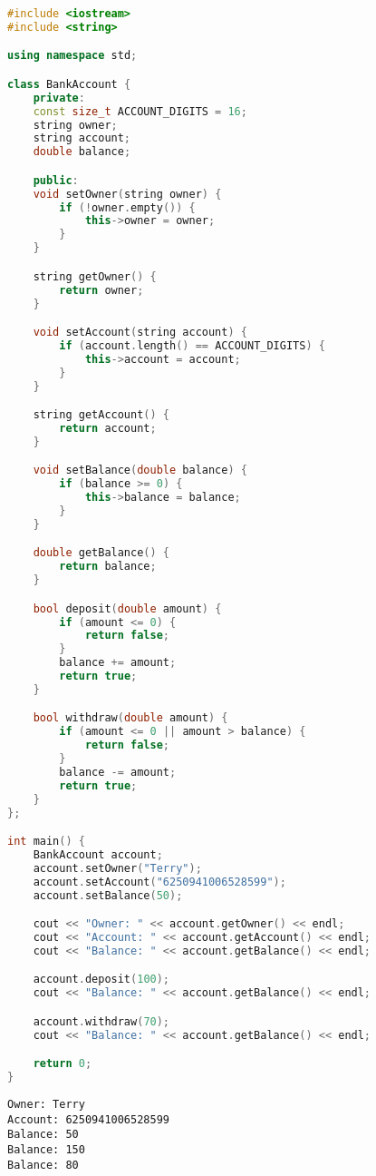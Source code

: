 \begin{lstlisting}[language=C++]
#include <iostream>
#include <string>

using namespace std;

class BankAccount {
    private:
    const size_t ACCOUNT_DIGITS = 16;
    string owner;
    string account;
    double balance;

    public:
    void setOwner(string owner) {
        if (!owner.empty()) {
            this->owner = owner;
        }
    }

    string getOwner() {
        return owner;
    }

    void setAccount(string account) {
        if (account.length() == ACCOUNT_DIGITS) {
            this->account = account;
        }
    }

    string getAccount() {
        return account;
    }

    void setBalance(double balance) {
        if (balance >= 0) {
            this->balance = balance;
        }
    }

    double getBalance() {
        return balance;
    }

    bool deposit(double amount) {
        if (amount <= 0) {
            return false;
        }
        balance += amount;
        return true;
    }

    bool withdraw(double amount) {
        if (amount <= 0 || amount > balance) {
            return false;
        }
        balance -= amount;
        return true;
    }
};

int main() {
    BankAccount account;
    account.setOwner("Terry");
    account.setAccount("6250941006528599");
    account.setBalance(50);

    cout << "Owner: " << account.getOwner() << endl;
    cout << "Account: " << account.getAccount() << endl;
    cout << "Balance: " << account.getBalance() << endl;

    account.deposit(100);
    cout << "Balance: " << account.getBalance() << endl;

    account.withdraw(70);
    cout << "Balance: " << account.getBalance() << endl;

    return 0;
}
\end{lstlisting}

\begin{tcolorbox}
    \begin{verbatim}
Owner: Terry
Account: 6250941006528599
Balance: 50
Balance: 150
Balance: 80
\end{verbatim}
\end{tcolorbox}

